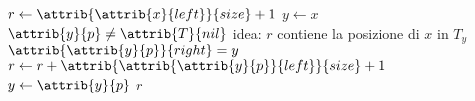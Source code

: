 \begin{codebox}
\li $r \gets \attrib{\attrib{x}{left}}{size} + 1$
\li $y \gets x$
\li \While $\attrib{y}{p} \neq \attrib{T}{nil}$
    \Comment idea: $r$ contiene la posizione di $x$ in $T_y$
\li \Do
        \If $\attrib{\attrib{y}{p}}{right} = y$
\li     \Then
            $r \gets r + \attrib{\attrib{\attrib{y}{p}}{left}}{size} + 1$
        \End
\li     $y \gets \attrib{y}{p}$
    \End
\li \Return $r$
\end{codebox}